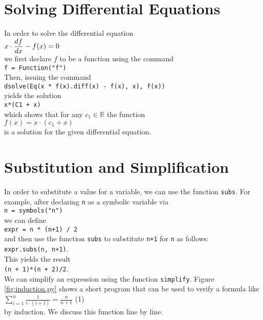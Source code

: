 \documentclass{report}
\begin{document}
\section{Solving Differential Equations}
In order to solve the differential equation
\\[0.2cm]
\hspace*{1.3cm}
$\displaystyle x \cdot \frac{d\hspace{0.1pt}f}{dx} - f(x) = 0$
\\[0.2cm]
we first declare $f$ to be a function using the command 
\\[0.2cm]
\hspace*{1.3cm}
\texttt{f = Function("f")}
\\[0.2cm]
Then, issuing the command
\\[0.2cm]
\hspace*{1.3cm}
\texttt{dsolve(Eq(x * f(x).diff(x) - f(x), x), f(x))}
\\[0.2cm]
yields the solution
\\[0.2cm]
\hspace*{1.3cm}
\texttt{x*(C1 + x)}
\\[0.2cm]
which shows that for any $c_1 \in \mathbb{R}$ the function
\\[0.2cm]
\hspace*{1.3cm}
$f(x) = x \cdot (c_{1} + x)$
\\[0.2cm]
is a solution for the given differential equation.

\section{Substitution and Simplification}
In order to substitute a value for a variable, we can use the function \texttt{subs}.  For
example, after declaring \texttt{n} as a symbolic variable via
\\[0.2cm]
\hspace*{1.3cm}
\texttt{n = symbols("n")}
\\[0.2cm]
we can define
\\[0.2cm]
\hspace*{1.3cm}
\texttt{expr = n * (n+1) / 2}
\\[0.2cm]
and then use the function \texttt{subs} to substitute \texttt{n+1} for \texttt{n} as follows:
\\[0.2cm]
\hspace*{1.3cm}
\texttt{expr.subs(n, n+1)}.
\\[0.2cm]
This yields the result
\\[0.2cm]
\hspace*{1.3cm}
\texttt{(n + 1)*(n + 2)/2}.
\\[0.2cm]
We can simplify an expression using the function \texttt{simplify}.
Figure \ref{fig:induction.py} shows a short program that can be used to verify a formula like
\\[0.2cm]
\hspace*{1.3cm}
$\displaystyle  \sum\limits_{i=1}^n \frac{1}{i \cdot (i+1)} = \frac{n}{n+1}$ \hspace*{\fill} (1)
\\[0.2cm]
by induction.  We discuss this function line by line.
\end{document}
